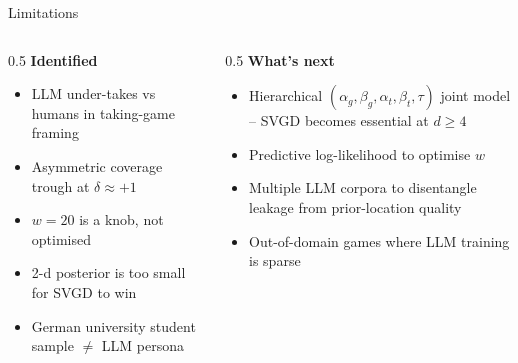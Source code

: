 \documentclass[10pt, aspectratio=169]{beamer}
\begin{document}
\begin{frame}{Limitations}
\begin{columns}[T]
\begin{column}{0.5\textwidth}
\textbf{Identified}
\begin{itemize}\setlength{\itemsep}{2pt}
  \item LLM under-takes vs humans in taking-game framing
  \item Asymmetric coverage trough at $\delta \approx +1$
  \item $w=20$ is a knob, not optimised
  \item 2-d posterior is too small for SVGD to win
  \item German university student sample $\ne$ LLM persona
\end{itemize}
\end{column}
\begin{column}{0.5\textwidth}
\textbf{What's next}
\begin{itemize}\setlength{\itemsep}{2pt}
  \item Hierarchical $(\alpha_g, \beta_g, \alpha_t, \beta_t, \tau)$ joint model -- SVGD becomes essential at $d \ge 4$
  \item Predictive log-likelihood to optimise $w$
  \item Multiple LLM corpora to disentangle leakage from prior-location quality
  \item Out-of-domain games where LLM training is sparse
\end{itemize}
\end{column}
\end{columns}
\end{frame}
\end{document}
